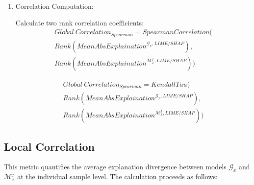 \documentclass{article}
\begin{document}
\begin{enumerate}
\begin{align}
    Rank\left( {MeanAbsExplaination}^{\mathcal{M}_{x}^{j},LIME/SHAP} \right) \nonumber \\= (r_{1}^{\mathcal{M}_{x}^{j},LIME/SHAP},\ r_{2}^{\mathcal{M}_{x}^{j},LIME/SHAP},\ldots r_{m}^{\mathcal{M}_{x}^{j},LIME/SHAP})\nonumber
\end{align}
    
    
    where each rank is computed as:
    
    $$r_{i}^{\mathcal{G}_{x},LIME/SHAP} = \sum_{z \neq i}^{}\mathbb{I}(a_{z}^{\mathcal{G}_{x},LIME/SHAP} > a_{i}^{\mathcal{G}_{x},LIME/SHAP})$$
    
    $$r_{i}^{\mathcal{M}_{x}^{j},LIME/SHAP} = \sum_{z \neq i}^{}\mathbb{I}(a_{z}^{\mathcal{M}_{x}^{j},LIME/SHAP} > a_{i}^{\mathcal{M}_{x}^{j},LIME/SHAP})$$
    
    \item Correlation Computation:
    
    Calculate two rank correlation coefficients:
\begin{align}
    {Global\ Correlation}_{Spearman} =
    SpearmanCorrelation(
    \nonumber \\ 
    Rank\left({MeanAbsExplaination}^{\mathcal{G}_{x},LIME/SHAP} \right), 
    \nonumber \\ 
    Rank\left({MeanAbsExplaination}^{\mathcal{M}_{x}^{j},LIME/SHAP} \right))
    \nonumber
\end{align}

\begin{align}
    {Global\ Correlation}_{Spearman} =
    KendallTau(
    \nonumber \\ 
    Rank\left({MeanAbsExplaination}^{\mathcal{G}_{x},LIME/SHAP} \right), 
    \nonumber \\ 
    Rank\left({MeanAbsExplaination}^{\mathcal{M}_{x}^{j},LIME/SHAP} \right))
    \nonumber
\end{align}
\end{enumerate}

\subsection{Local Correlation}

This metric quantifies the average explanation divergence between models $\mathcal{G}_{x}$ and $\mathcal{M}_{x}^{j}$ at the individual sample level. The calculation proceeds as follows:
\end{document}
